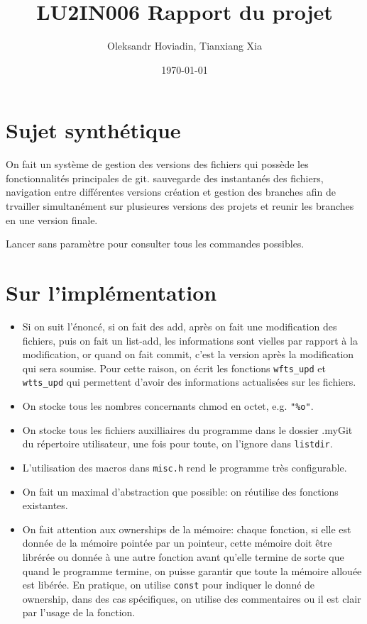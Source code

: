 \documentclass{report}
\title{LU2IN006 Rapport du projet}
\author{Oleksandr Hoviadin, Tianxiang Xia}
\date{\today}
\begin{document}
\maketitle
\section{Sujet synthétique}
On fait un système de gestion des versions des fichiers
qui possède les fonctionnalités principales de git. sauvegarde des instantanés
des fichiers, navigation entre différentes versions
création et gestion des branches afin de trvailler simultanément
sur plusieures versions des projets et reunir les branches
en une version finale.

Lancer sans paramètre pour consulter tous les commandes possibles.
\section{Sur l'implémentation}
\begin{itemize}
  \item Si on suit l'énoncé, si on fait des add, après on fait une modification des fichiers,
  puis on fait un list-add, les informations sont vielles par rapport à la modification, or quand on
  fait commit, c'est la version après la modification qui sera soumise. Pour cette raison, on écrit les
  fonctions \verb|wfts_upd| et \verb|wtts_upd| qui permettent d'avoir des informations actualisées sur
  les fichiers.
  \item On stocke tous les nombres concernants chmod en octet, e.g. \verb|"%o"|.
  \item On stocke tous les fichiers auxilliaires du programme dans le dossier .myGit
  du répertoire utilisateur, une fois pour toute, on l'ignore dans \verb|listdir|.
  \item L'utilisation des macros dans \verb|misc.h| rend le programme très configurable.
  \item On fait un maximal d'abstraction que possible: on réutilise des fonctions existantes.
  \item On fait attention aux ownerships de la mémoire: chaque fonction, si elle est donnée de la mémoire pointée
  par un pointeur, cette mémoire doit être librérée ou donnée à une autre fonction avant qu'elle termine de sorte
  que quand le programme termine, on puisse garantir que toute la mémoire allouée est libérée. En pratique, on utilise
  \verb|const| pour indiquer le donné de ownership, dans des cas spécifiques, on utilise des commentaires ou il est
  clair par l'usage de la fonction.
\end{itemize}
\end{document}
